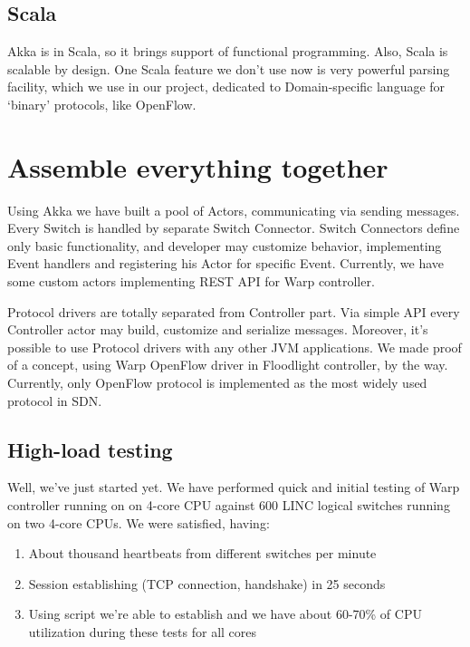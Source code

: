 \documentclass[10pt, a5paper]{article}
\begin{document}
\subsection*{Scala}

Akka is in Scala, so it brings support of functional programming.
Also, Scala is scalable by design. One Scala feature we don't use now is very powerful parsing facility, which we use in our project, dedicated to Domain-specific language for `binary' protocols, like OpenFlow.

\section*{Assemble everything together}

Using Akka we have built a pool of Actors, communicating via sending messages. Every Switch is handled by separate Switch Connec\-tor. Switch Connectors define only basic functionality, and developer may customize behavior, implementing Event handlers and registering his Actor for specific Event. Currently, we have some custom actors imple\-menting REST API for Warp controller.

Protocol drivers are totally separated from Controller part. Via simple API every Controller actor may build, customize and serialize messages. Moreover, it's possible to use Protocol drivers with any other JVM applications. We made proof of a concept, using Warp OpenFlow driver in Floodlight controller, by the way.
Currently, only OpenFlow protocol is implemented as the most widely used protocol in SDN.

\subsection*{High-load testing}

Well, we've just started yet. We have performed quick and initial testing of Warp controller running on on 4-core CPU against 600 LINC logical switches running on two 4-core CPUs. We were satisfied, having:

\begin{enumerate}
  \item About thousand heartbeats from different switches per minute
  \item Session establishing (TCP connection, handshake) in 25 seconds
  \item Using script we're able to establish and we have about 60-70\% of CPU utilization during these tests for all cores
\end{enumerate}
\end{document}
